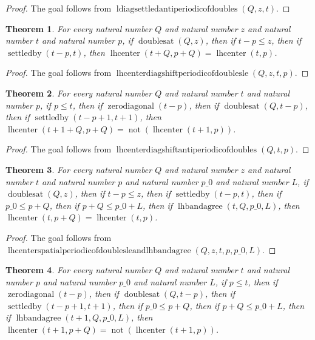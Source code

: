 \documentclass[11pt]{article}
\newtheorem{theorem}{Theorem}[section]
\theoremstyle{definition}
\begin{document}
\begin{proof}
The goal follows from \(\operatorname{ldiagsettledantiperiodicofdoubles}(Q, z, t)\).
\end{proof}
\begin{theorem}
\label{ll:paper:lhcenter-diag-shift-periodic-of-doubles-le}
For every natural number \(Q\) and natural number \(z\) and natural number \(t\) and natural number \(p\), if \(\operatorname{doublesat}(Q, z)\), then if \(t - p \le z\), then if \(\operatorname{settledby}(t - p, t)\), then \(\operatorname{lhcenter}(t + Q, p + Q) = \operatorname{lhcenter}(t, p)\).
\end{theorem}
\begin{proof}
The goal follows from \(\operatorname{lhcenterdiagshiftperiodicofdoublesle}(Q, z, t, p)\).
\end{proof}
\begin{theorem}
\label{ll:paper:lhcenter-diag-shift-antiperiodic-of-doubles}
For every natural number \(Q\) and natural number \(t\) and natural number \(p\), if \(p \le t\), then if \(\operatorname{zerodiagonal}(t - p)\), then if \(\operatorname{doublesat}(Q, t - p)\), then if \(\operatorname{settledby}(t - p + 1, t + 1)\), then \(\operatorname{lhcenter}(t + 1 + Q, p + Q) = \operatorname{not}(\operatorname{lhcenter}(t + 1, p))\).
\end{theorem}
\begin{proof}
The goal follows from \(\operatorname{lhcenterdiagshiftantiperiodicofdoubles}(Q, t, p)\).
\end{proof}
\begin{theorem}
\label{ll:paper:lhcenter-spatial-periodic-of-doubles-le-and-lhbandagree}
For every natural number \(Q\) and natural number \(z\) and natural number \(t\) and natural number \(p\) and natural number \(p\_0\) and natural number \(L\), if \(\operatorname{doublesat}(Q, z)\), then if \(t - p \le z\), then if \(\operatorname{settledby}(t - p, t)\), then if \(p\_0 \le p + Q\), then if \(p + Q \le p\_0 + L\), then if \(\operatorname{lhbandagree}(t, Q, p\_0, L)\), then \(\operatorname{lhcenter}(t, p + Q) = \operatorname{lhcenter}(t, p)\).
\end{theorem}
\begin{proof}
The goal follows from \(\operatorname{lhcenterspatialperiodicofdoublesleandlhbandagree}(Q, z, t, p, p\_0, L)\).
\end{proof}
\begin{theorem}
\label{ll:paper:lhcenter-spatial-antiperiodic-of-doubles-and-lhbandagree}
For every natural number \(Q\) and natural number \(t\) and natural number \(p\) and natural number \(p\_0\) and natural number \(L\), if \(p \le t\), then if \(\operatorname{zerodiagonal}(t - p)\), then if \(\operatorname{doublesat}(Q, t - p)\), then if \(\operatorname{settledby}(t - p + 1, t + 1)\), then if \(p\_0 \le p + Q\), then if \(p + Q \le p\_0 + L\), then if \(\operatorname{lhbandagree}(t + 1, Q, p\_0, L)\), then \(\operatorname{lhcenter}(t + 1, p + Q) = \operatorname{not}(\operatorname{lhcenter}(t + 1, p))\).
\end{theorem}
\end{document}
